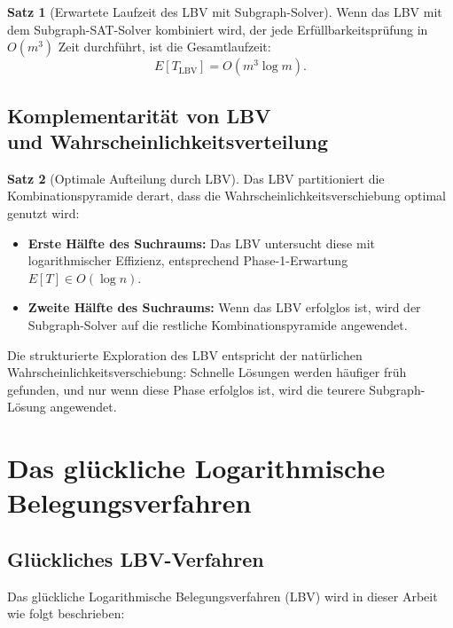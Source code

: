 ﻿\documentclass[a4paper,12pt]{article}
\theoremstyle{definition}
\newtheorem{satz}{Satz}
\begin{document}
\begin{satz}[Erwartete Laufzeit des LBV mit Subgraph-Solver]
\label{satz:lbv-laufzeit}
Wenn das LBV mit dem Subgraph-SAT-Solver kombiniert wird, der jede Erfüllbarkeitsprüfung in $O(m^3)$ Zeit durchführt, ist die Gesamtlaufzeit:
\[
E[T_{\text{LBV}}] = O(m^3 \log m).
\]
\end{satz}

\subsection{Komplementarität von LBV \\
und Wahrscheinlichkeitsverteilung}

\begin{satz}[Optimale Aufteilung durch LBV]
\label{satz:lbv-optimal}
Das LBV partitioniert die Kombinationspyramide derart, dass die Wahrscheinlichkeitsverschiebung optimal genutzt wird:

\begin{itemize}
	\item \textbf{Erste Hälfte des Suchraums:} Das LBV untersucht diese mit logarithmischer Effizienz, entsprechend Phase-1-Erwartung $E[T] \in O(\log n)$.
	
	\item \textbf{Zweite Hälfte des Suchraums:} Wenn das LBV erfolglos ist, wird der Subgraph-Solver auf die restliche Kombinationspyramide angewendet.
\end{itemize}

Die strukturierte Exploration des LBV entspricht der natürlichen Wahrscheinlichkeitsverschiebung: Schnelle Lösungen werden häufiger früh gefunden, und nur wenn diese Phase erfolglos ist, wird die teurere Subgraph-Lösung angewendet.
\end{satz}

\section{Das glückliche Logarithmische Belegungsverfahren}

\subsection{Glückliches LBV-Verfahren}

Das glückliche Logarithmische Belegungsverfahren (LBV) wird in dieser Arbeit wie folgt beschrieben:
\end{document}
